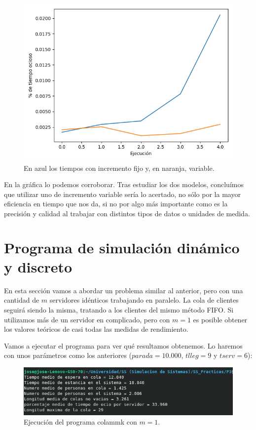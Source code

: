 \documentclass[11pt,a4paper]{report}
\begin{document}
\begin{figure}[H]
\centering
\includegraphics[scale=0.7]{img/tiempos.png}
\caption{En azul los tiempos con incremento fijo y, en naranja, variable.}
\end{figure}

En la gráfica lo podemos corroborar. Tras estudiar los dos modelos, concluímos que utilizar uno de incremento variable sería lo acertado, no sólo por la mayor
eficiencia en tiempo que nos da, si no por algo más importante como es la precisión y calidad al trabajar con distintos tipos de datos o unidades de medida.




\section{Programa de simulación dinámico y discreto}

En esta sección vamos a abordar un problema similar al anterior, pero con una cantidad de $m$ servidores idénticos trabajando en paralelo. La cola de clientes
seguirá siendo la misma, tratando a los clientes del mismo método FIFO. Si utilizamos más de un servidor en complicado, pero con $m=1$ es posible obtener los
valores teóricos de casi todas las medidas de rendimiento.

Vamos a ejecutar el programa para ver qué resultamos obtenemos. Lo haremos con unos parámetros como los anteriores ($parada=10.000$, $tlleg=9$ y $tserv=6$):
\begin{figure}[H]
\centering
\includegraphics[scale=0.8]{img/cola-m1.png}
\caption{Ejecución del programa colammk con $m=1$.}
\end{figure}
\end{document}
